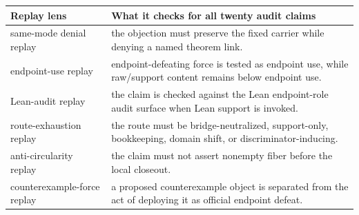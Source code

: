 \documentclass[11pt]{article}
\begin{document}
{\scriptsize
\begin{longtable}{p{}p{}}
\toprule
Replay lens & What it checks for all twenty audit claims\\
\midrule
\endhead
same-mode denial replay & the objection must preserve the fixed carrier while denying a named theorem link.\\
endpoint-use replay & endpoint-defeating force is tested as endpoint use, while raw/support content remains below endpoint use.\\
Lean-audit replay & the claim is checked against the Lean endpoint-role audit surface when Lean support is invoked.\\
route-exhaustion replay & the route must be bridge-neutralized, support-only, bookkeeping, domain shift, or discriminator-inducing.\\
anti-circularity replay & the claim must not assert nonempty fiber before the local closeout.\\
counterexample-force replay & a proposed counterexample object is separated from the act of deploying it as official endpoint defeat.\\
\bottomrule
\end{longtable}
}
\end{document}
